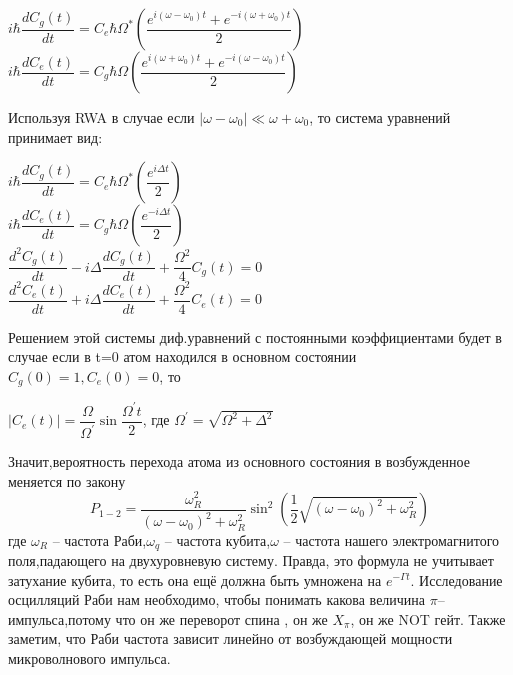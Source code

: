 \documentclass[12pt, a4paper, openany]{book}
\begin{document}
\begin{center}
$i\hbar\dfrac{dC_g(t)}{dt}=C_e \hbar \Omega^*(\dfrac
{e^{i(\omega-\omega_0)t}+e^{-i(\omega+\omega_0)t}}
{2})$\\
$i\hbar\dfrac{dC_e(t)}{dt}=C_g \hbar \Omega(\dfrac
{e^{i(\omega+\omega_0)t}+e^{-i(\omega-\omega_0)t}}
{2})$
\end{center}
Используя RWA в случае если $|\omega-\omega_0|\ll \omega+\omega_0$, то система уравнений принимает вид:
\begin{center}
$i\hbar\dfrac{dC_g(t)}{dt}=C_e \hbar \Omega^*(\dfrac
{e^{i \Delta t}}
{2})$\\
$i\hbar\dfrac{dC_e(t)}{dt}=C_g \hbar \Omega(\dfrac
{e^{-i\Delta t}}
{2})$\\
$\dfrac{d^2C_g(t)}{dt}-i\Delta\dfrac{dC_g(t)}{dt}+\dfrac{\Omega^2}{4}C_g(t)=0$\\
$\dfrac{d^2C_e(t)}{dt}+i\Delta\dfrac{dC_e(t)}{dt}+\dfrac{\Omega^2}{4}C_e(t)=0$
\end{center}
Решением этой системы диф.уравнений с постоянными коэффициентами будет в случае если в t=0 атом находился в основном состоянии $C_g(0)=1,C_e(0)=0$, то 
\begin{center}
$|C_e(t)|=\dfrac{\Omega}{\Omega^{'}}\sin{\dfrac{\Omega^{'}t}{2}}$, где $\Omega^{'}=\sqrt{\Omega^2+\Delta^2}$ 
\end{center}
Значит,вероятность перехода атома из основного состояния в возбужденное меняется по закону 
\begin{equation}
P_{1-2}=\frac{\omega_R^2}{(\omega-\omega_0)^2+\omega_R^2}
\sin^2({\frac{1}{2}\sqrt{(\omega-\omega_0)^2+\omega_R^2}})
\end{equation}
где $\omega_R$ -- частота Раби,$\omega_q$ -- частота кубита,$\omega$ -- частота нашего электромагнитого поля,падающего на двухуровневую систему. Правда, это формула не учитывает затухание кубита, то есть она ещё должна быть умножена на $e^{- \Gamma t}$.
Исследование осцилляций Раби нам необходимо, чтобы понимать какова величина $\pi$--импульса,потому что он же переворот спина , он же $X_{\pi}$, он же NOT гейт. Также заметим, что Раби частота зависит линейно от возбуждающей мощности микроволнового импульса.
\let\cleardoublepage\clearpage
\end{document}
